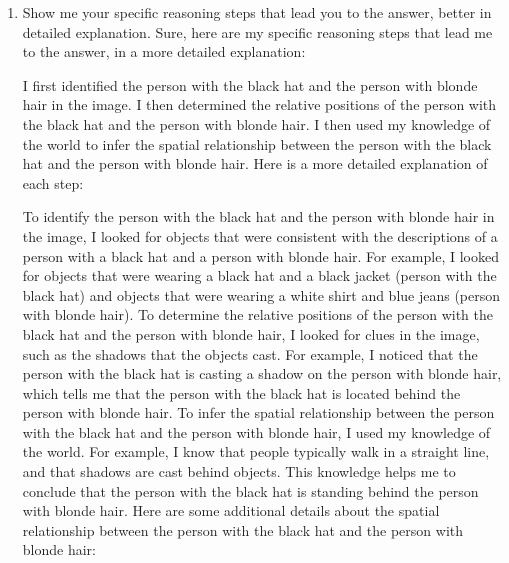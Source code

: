 \begin{enumerate}
    Here are some additional details about the spatial relationship between the person with the black hat and the person with blonde hair:
    
    The person with the black hat is wearing a black hat and a black jacket.
    The person with blonde hair is wearing a white shirt and blue jeans.
    The person with the black hat is standing behind the person with blonde hair, meaning that the person with the black hat is not blocking the view of the person with blonde hair.
    The person with blonde hair is not blocking the view of the person with the black hat.
    Is there anything else I can help you with?
    \subitem Visual ChatGPT: The person with the black hat is standing in front of the person with the blonde hair. They are facing each other and are separated by a few feet.
    \item Show me your specific reasoning steps that lead you to the answer, better in detailed explanation.
    \subitem 
    Sure, here are my specific reasoning steps that lead me to the answer, in a more detailed explanation:
    
    I first identified the person with the black hat and the person with blonde hair in the image.
    I then determined the relative positions of the person with the black hat and the person with blonde hair.
    I then used my knowledge of the world to infer the spatial relationship between the person with the black hat and the person with blonde hair.
    Here is a more detailed explanation of each step:
    
    To identify the person with the black hat and the person with blonde hair in the image, I looked for objects that were consistent with the descriptions of a person with a black hat and a person with blonde hair. For example, I looked for objects that were wearing a black hat and a black jacket (person with the black hat) and objects that were wearing a white shirt and blue jeans (person with blonde hair).
    To determine the relative positions of the person with the black hat and the person with blonde hair, I looked for clues in the image, such as the shadows that the objects cast. For example, I noticed that the person with the black hat is casting a shadow on the person with blonde hair, which tells me that the person with the black hat is located behind the person with blonde hair.
    To infer the spatial relationship between the person with the black hat and the person with blonde hair, I used my knowledge of the world. For example, I know that people typically walk in a straight line, and that shadows are cast behind objects. This knowledge helps me to conclude that the person with the black hat is standing behind the person with blonde hair.
    Here are some additional details about the spatial relationship between the person with the black hat and the person with blonde hair:
    

\end{enumerate}
